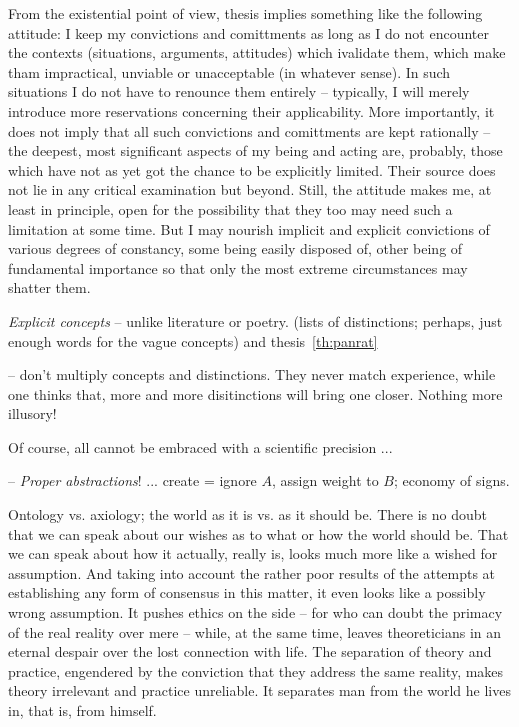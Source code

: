 {\pa
From the existential point of view, thesis  implies something 
like the following attitude: I keep my convictions and comittments as long as
I do not encounter the contexts (situations, arguments, attitudes) 
which ivalidate them, which make tham impractical, 
unviable or unacceptable (in whatever sense). In such situations I do not have
to renounce them entirely -- typically, I will merely introduce more reservations
concerning their applicability. More importantly, it does not imply
that all such convictions and comittments are kept rationally -- the deepest, 
most significant aspects of my being and acting are, probably, those which 
have not as yet got the chance to be explicitly limited. Their source does not
lie in any critical examination but beyond. Still, the attitude makes me, at least
in principle, open for the possibility that they too may need such a limitation 
at some time. But I may nourish implicit and explicit convictions of various
degrees of constancy, some being easily disposed of, other being of fundamental
importance so that only the most extreme circumstances may shatter them.

\pa
{\em Explicit concepts} -- unlike literature or poetry. (lists of 
distinctions; perhaps, just enough words for the vague concepts)
and thesis~\ref{th:panrat}

-- don't multiply concepts and distinctions. 
They never match experience, while one thinks 
that, more and more disitinctions will bring one closer. Nothing more 
illusory!

\pa
Of course, all cannot be embraced with a scientific precision ...

-- {\em Proper abstractions}! ... create = ignore $A$, assign weight to $B$; 
economy of signs.


Ontology vs. axiology; the world as it is vs. as it should be. There is no 
doubt that we can speak about our wishes as to what or how the world should 
be. That we can speak about how it actually, really is, looks much more 
like a wished for assumption. And taking into account the 
rather poor results of the attempts at establishing any form of consensus 
in this matter, it even looks like a possibly wrong assumption. 
It pushes ethics on the side -- for who can doubt the primacy of the real 
reality over mere  -- while, at the same time, leaves theoreticians 
in an eternal despair over the lost connection with life. 
The separation of theory and practice, engendered by the conviction that they 
address the same reality, makes theory irrelevant and practice unreliable. 
It separates man from the world he lives in, that is, from himself. 

}
